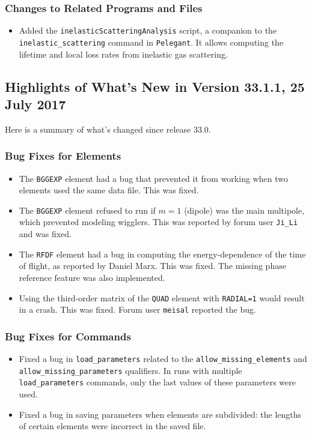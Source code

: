 \documentclass[11pt]{article}
\begin{document}
\subsubsection{Changes to Related Programs and Files}

\begin{itemize}
\item Added the \verb|inelasticScatteringAnalysis| script, a companion to the \verb|inelastic_scattering| command in
  \verb|Pelegant|. It allows computing the lifetime and local loss rates from inelastic gas scattering.
\end{itemize}


\subsection{Highlights of What's New in Version 33.1.1, 25 July 2017}

Here is a summary of what's changed since release 33.0.

\subsubsection{Bug Fixes for Elements}

\begin{itemize}
\item The \verb|BGGEXP| element had a bug that prevented it from working when two elements
  used the same data file. This was fixed.
\item The \verb|BGGEXP| element refused to run if $m=1$ (dipole) was the main multipole, which
  prevented modeling wigglers. This was reported by forum user \verb|Ji_Li| and was fixed.
\item The \verb|RFDF| element had a bug in computing the energy-dependence of the time of flight,
  as reported by Daniel Marx. This was fixed. The missing phase reference feature was also implemented.
\item Using the third-order matrix of the \verb|QUAD| element with \verb|RADIAL=1| would result in a crash.
  This was fixed. Forum user \verb|meisal| reported the bug.
\end{itemize}

\subsubsection{Bug Fixes for Commands}
\begin{itemize}
\item Fixed a bug in \verb|load_parameters| related to the \verb|allow_missing_elements| and \\ \verb|allow_missing_parameters|
  qualifiers. In runs with multiple \verb|load_parameters| commands, only the last values of these parameters were used.
\item Fixed a bug in saving parameters when elements are subdivided: the lengths of certain elements were incorrect in
  the saved file.
\end{itemize}
\end{document}
